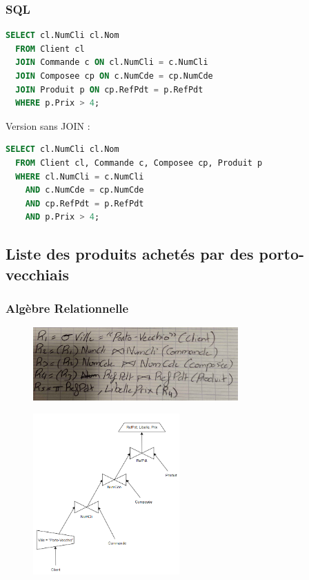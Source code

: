 \documentclass{article}
\begin{document}
\subsubsection{SQL}

\begin{lstlisting}[language=SQL]
  SELECT cl.NumCli cl.Nom 
  FROM Client cl
  JOIN Commande c ON cl.NumCli = c.NumCli
  JOIN Composee cp ON c.NumCde = cp.NumCde
  JOIN Produit p ON cp.RefPdt = p.RefPdt
  WHERE p.Prix > 4;
\end{lstlisting}

Version sans JOIN :

\begin{lstlisting}[language=SQL]
  SELECT cl.NumCli cl.Nom 
  FROM Client cl, Commande c, Composee cp, Produit p
  WHERE cl.NumCli = c.NumCli 
    AND c.NumCde = cp.NumCde 
    AND cp.RefPdt = p.RefPdt 
    AND p.Prix > 4;
\end{lstlisting}

\subsection{Liste des produits achetés par des porto-vecchiais}

\subsubsection{Algèbre Relationnelle}

\begin{figure}[H]
  \centering
  \includegraphics[width=0.7\textwidth]{alg/10.png}
  \label{fig:alg-rel}
\end{figure}

\begin{figure}[H]
  \centering
  \includegraphics[width=0.5\textwidth]{algRel/10.png}
  \label{fig:alg-rel}
\end{figure}
\end{document}
